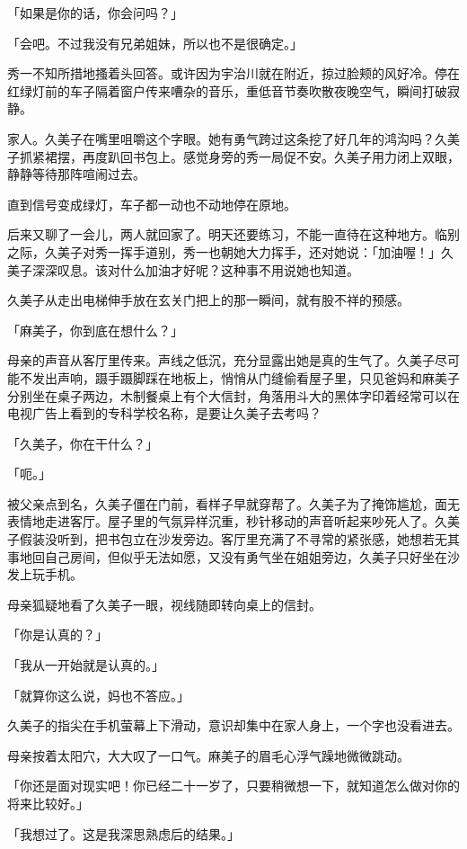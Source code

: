 \documentclass[UTF8]{ctexart}
\begin{document}
    「如果是你的话，你会问吗？」 

    「会吧。不过我没有兄弟姐妹，所以也不是很确定。」 

    秀一不知所措地搔着头回答。或许因为宇治川就在附近，掠过脸颊的风好冷。停在红绿灯前的车子隔着窗户传来嘈杂的音乐，重低音节奏吹散夜晚空气，瞬间打破寂静。 

    家人。久美子在嘴里咀嚼这个字眼。她有勇气跨过这条挖了好几年的鸿沟吗？久美子抓紧裙摆，再度趴回书包上。感觉身旁的秀一局促不安。久美子用力闭上双眼，静静等待那阵喧闹过去。 

    直到信号变成绿灯，车子都一动也不动地停在原地。 

    后来又聊了一会儿，两人就回家了。明天还要练习，不能一直待在这种地方。临别之际，久美子对秀一挥手道别，秀一也朝她大力挥手，还对她说：「加油喔！」久美子深深叹息。该对什么加油才好呢？这种事不用说她也知道。 

    久美子从走出电梯伸手放在玄关门把上的那一瞬间，就有股不祥的预感。 

    「麻美子，你到底在想什么？」 

    母亲的声音从客厅里传来。声线之低沉，充分显露出她是真的生气了。久美子尽可能不发出声响，蹑手蹑脚踩在地板上，悄悄从门缝偷看屋子里，只见爸妈和麻美子分别坐在桌子两边，木制餐桌上有个大信封，角落用斗大的黑体字印着经常可以在电视广告上看到的专科学校名称，是要让久美子去考吗？ 

    「久美子，你在干什么？」 

    「呃。」 

    被父亲点到名，久美子僵在门前，看样子早就穿帮了。久美子为了掩饰尴尬，面无表情地走进客厅。屋子里的气氛异样沉重，秒针移动的声音听起来吵死人了。久美子假装没听到，把书包立在沙发旁边。客厅里充满了不寻常的紧张感，她想若无其事地回自己房间，但似乎无法如愿，又没有勇气坐在姐姐旁边，久美子只好坐在沙发上玩手机。 

    母亲狐疑地看了久美子一眼，视线随即转向桌上的信封。 

    「你是认真的？」 

    「我从一开始就是认真的。」 

    「就算你这么说，妈也不答应。」 

    久美子的指尖在手机萤幕上下滑动，意识却集中在家人身上，一个字也没看进去。 

    母亲按着太阳穴，大大叹了一口气。麻美子的眉毛心浮气躁地微微跳动。 

    「你还是面对现实吧！你已经二十一岁了，只要稍微想一下，就知道怎么做对你的将来比较好。」 

    「我想过了。这是我深思熟虑后的结果。」 
\end{document}
